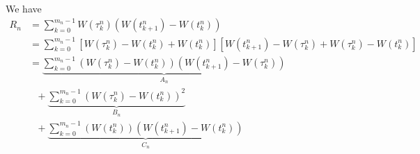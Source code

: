 \begin{solution}
  We have
  \begin{align*}
    R_n
     & = \sum\limits_{k=0}^{m_n-1} W(\tau_k^n)(W(t^n_{k+1})-W({t^n_{k}}))                                                                      \\
     & =
    \sum\limits_{k=0}^{m_n-1}\left[ W(\tau_k^n) - W(t_k^n) + W(t_k^n)\right]\left[W(t^n_{k+1}) - W(\tau_k^n) + W(\tau_k^n) - W(t^n_{k})\right] \\
     & = \underbrace{\sum\limits_{k=0}^{m_n-1}(W(\tau_k^n) - W(t_k^n))(W(t^n_{k+1}) - W(\tau_k^n)) }_{A_n}
    \\
     & \,\,\,\, + \underbrace{\sum\limits_{k=0}^{m_n-1}(W(\tau_k^n) - W(t_k^n))^2  }_{B_n}
    \\
     & \,\,\,\, + \underbrace{ \sum\limits_{k=0}^{m_n-1}(W(t_k^n))(W(t^n_{k+1}) - W(t_k^n))}_{C_n}
  \end{align*}


\end{solution}
